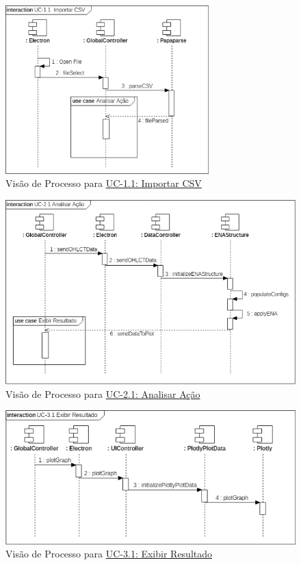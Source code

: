 \documentclass[12pt]{article}
\begin{document}
\begin{figure}[H]
	\centering
	\includegraphics[width=0.7\textwidth]{ProcessViewUC-1_1.png}
	\caption{Visão de Processo para \hyperref[tab:UC-1.1]{UC-1.1: Importar CSV}}
	\label{fig:ProcessView-UC-1.1}
\end{figure}

\begin{figure}[H]
	\centering
	\includegraphics[width=\textwidth]{ProcessViewUC-2_1.png}
	\caption{Visão de Processo para \hyperref[tab:UC-2.1]{UC-2.1: Analisar Ação}}
	\label{fig:ProcessView-UC-2.1}
\end{figure}

\begin{figure}[H]
	\centering
	\includegraphics[width=\textwidth]{ProcessViewUC-3_1.png}
	\caption{Visão de Processo para \hyperref[tab:UC-3.1]{UC-3.1: Exibir Resultado}}
	\label{fig:ProcessView-UC-3.1}
\end{figure}
\end{document}
